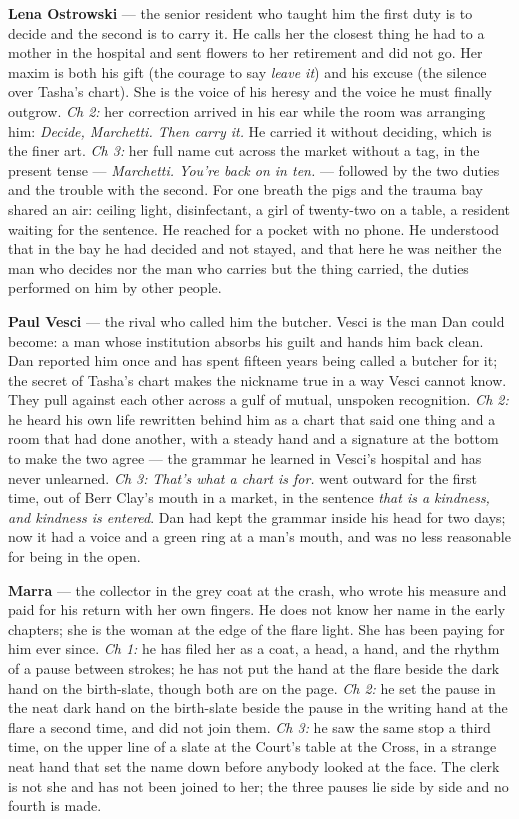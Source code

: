 \documentclass{design/chronicle}
\begin{document}
{\textbf{Lena Ostrowski} — the senior resident who taught him the first duty is to decide and the second is to carry it. He calls her the closest thing he had to a mother in the hospital and sent flowers to her retirement and did not go. Her maxim is both his gift (the courage to say \emph{leave it}) and his excuse (the silence over Tasha’s chart). She is the voice of his heresy and the voice he must finally outgrow. \emph{Ch 2:} her correction arrived in his ear while the room was arranging him: \emph{Decide, Marchetti. Then carry it.} He carried it without deciding, which is the finer art. \emph{Ch 3:} her full name cut across the market without a tag, in the present tense — \emph{Marchetti. You’re back on in ten.} — followed by the two duties and the trouble with the second. For one breath the pigs and the trauma bay shared an air: ceiling light, disinfectant, a girl of twenty-two on a table, a resident waiting for the sentence. He reached for a pocket with no phone. He understood that in the bay he had decided and not stayed, and that here he was neither the man who decides nor the man who carries but the thing carried, the duties performed on him by other people.

\textbf{Paul Vesci} — the rival who called him the butcher. Vesci is the man Dan could become: a man whose institution absorbs his guilt and hands him back clean. Dan reported him once and has spent fifteen years being called a butcher for it; the secret of Tasha’s chart makes the nickname true in a way Vesci cannot know. They pull against each other across a gulf of mutual, unspoken recognition. \emph{Ch 2:} he heard his own life rewritten behind him as a chart that said one thing and a room that had done another, with a steady hand and a signature at the bottom to make the two agree --- the grammar he learned in Vesci’s hospital and has never unlearned. \emph{Ch 3:} \emph{That’s what a chart is for.} went outward for the first time, out of Berr Clay’s mouth in a market, in the sentence \emph{that is a kindness, and kindness is entered}. Dan had kept the grammar inside his head for two days; now it had a voice and a green ring at a man’s mouth, and was no less reasonable for being in the open.

\textbf{Marra} — the collector in the grey coat at the crash, who wrote his measure and paid for his return with her own fingers. He does not know her name in the early chapters; she is the woman at the edge of the flare light. She has been paying for him ever since. \emph{Ch 1:} he has filed her as a coat, a head, a hand, and the rhythm of a pause between strokes; he has not put the hand at the flare beside the dark hand on the birth-slate, though both are on the page. \emph{Ch 2:} he set the pause in the neat dark hand on the birth-slate beside the pause in the writing hand at the flare a second time, and did not join them. \emph{Ch 3:} he saw the same stop a third time, on the upper line of a slate at the Court’s table at the Cross, in a strange neat hand that set the name down before anybody looked at the face. The clerk is not she and has not been joined to her; the three pauses lie side by side and no fourth is made.

}
\end{document}
